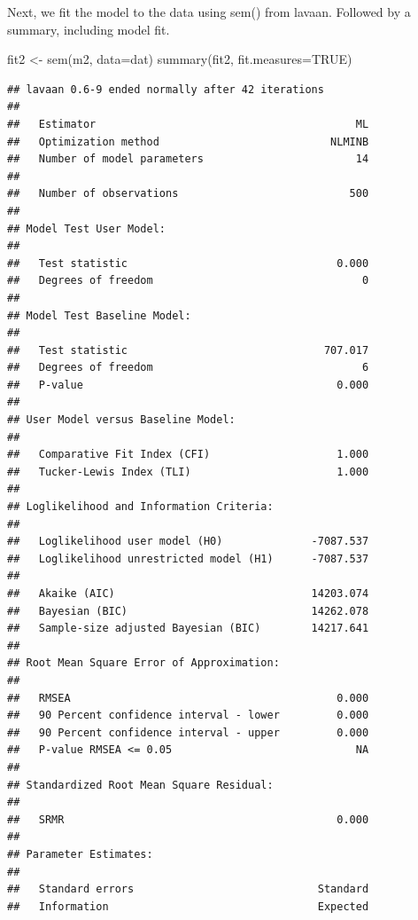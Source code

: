 \documentclass[
]{article}
\newenvironment{Shaded}{\begin{snugshade}}{\end{snugshade}}
\newcommand{\AttributeTok}[1]{\textcolor[rgb]{0.77,0.63,0.00}{#1}}
\newcommand{\ConstantTok}[1]{\textcolor[rgb]{0.00,0.00,0.00}{#1}}
\newcommand{\FunctionTok}[1]{\textcolor[rgb]{0.00,0.00,0.00}{#1}}
\newcommand{\NormalTok}[1]{#1}
\newcommand{\OtherTok}[1]{\textcolor[rgb]{0.56,0.35,0.01}{#1}}
\begin{document}
Next, we fit the model to the data using sem() from lavaan. Followed by
a summary, including model fit.

\begin{Shaded}
\begin{Highlighting}[]
\NormalTok{fit2 }\OtherTok{\textless{}{-}} \FunctionTok{sem}\NormalTok{(m2, }\AttributeTok{data=}\NormalTok{dat)}
\FunctionTok{summary}\NormalTok{(fit2, }\AttributeTok{fit.measures=}\ConstantTok{TRUE}\NormalTok{)}
\end{Highlighting}
\end{Shaded}

\begin{verbatim}
## lavaan 0.6-9 ended normally after 42 iterations
## 
##   Estimator                                         ML
##   Optimization method                           NLMINB
##   Number of model parameters                        14
##                                                       
##   Number of observations                           500
##                                                       
## Model Test User Model:
##                                                       
##   Test statistic                                 0.000
##   Degrees of freedom                                 0
## 
## Model Test Baseline Model:
## 
##   Test statistic                               707.017
##   Degrees of freedom                                 6
##   P-value                                        0.000
## 
## User Model versus Baseline Model:
## 
##   Comparative Fit Index (CFI)                    1.000
##   Tucker-Lewis Index (TLI)                       1.000
## 
## Loglikelihood and Information Criteria:
## 
##   Loglikelihood user model (H0)              -7087.537
##   Loglikelihood unrestricted model (H1)      -7087.537
##                                                       
##   Akaike (AIC)                               14203.074
##   Bayesian (BIC)                             14262.078
##   Sample-size adjusted Bayesian (BIC)        14217.641
## 
## Root Mean Square Error of Approximation:
## 
##   RMSEA                                          0.000
##   90 Percent confidence interval - lower         0.000
##   90 Percent confidence interval - upper         0.000
##   P-value RMSEA <= 0.05                             NA
## 
## Standardized Root Mean Square Residual:
## 
##   SRMR                                           0.000
## 
## Parameter Estimates:
## 
##   Standard errors                             Standard
##   Information                                 Expected

\end{verbatim}
\end{document}
